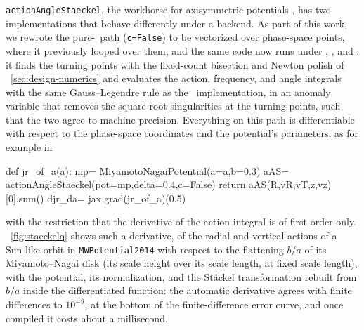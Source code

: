 \texttt{actionAngleStaeckel}, the workhorse for axisymmetric potentials
\citep{Binney2012,BovyRix2013},
has two implementations that behave differently under a backend. As
part of this work, we rewrote the pure-\python\ path (\texttt{c=False})
to be vectorized over phase-space points, where it previously looped
over them, and the same code now runs under \numpy, \jax, and \torch: it
finds the turning points with the fixed-count bisection and Newton
polish of \sectionname~\ref{sec:design-numerics} and evaluates the
action, frequency, and angle integrals with the same Gauss--Legendre
rule as the \cc\ implementation, in an anomaly variable that removes the
square-root singularities at the turning points, such that the two agree
to machine precision. Everything on this path is
differentiable with respect to the phase-space coordinates and the
potential's parameters, as for example in
\begin{code}
def jr_of_a(a):
    mp= MiyamotoNagaiPotential(a=a,b=0.3)
    aAS= actionAngleStaeckel(pot=mp,delta=0.4,c=False)
    return aAS(R,vR,vT,z,vz)[0].sum()
djr_da= jax.grad(jr_of_a)(0.5)
\end{code}
with the restriction that the derivative of the action integral is of
first order only. \figurename~\ref{fig:staeckelq} shows such a
derivative, of the radial and vertical actions of a Sun-like orbit in
\texttt{MWPotential2014} with respect to the flattening $b/a$ of its
Miyamoto--Nagai disk (its scale height over its scale length, at fixed
scale length), with the potential, its normalization, and the
St\"{a}ckel transformation rebuilt from $b/a$ inside the differentiated
function: the automatic derivative agrees with finite differences to
$10^{-9}$, at the bottom of the finite-difference error curve, and once
compiled it costs about a millisecond.

